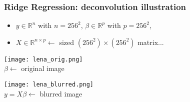 \documentclass[compress, smaller, serif, 9pt]{beamer}
\begin{document}
\begin{frame}
  \frametitle{Ridge Regression: deconvolution illustration}
  \begin{itemize}
   \item $y \in \mathbb{R}^{n}$ with $n=256^2$, \quad $\beta \in \mathbb{R}^{p}$ with $p=256^2$,
   \item $X \in \mathbb{R}^{n \times p} \leftarrow$ sized $(256^2) \times (256^2)$ matrix...
  \end{itemize}

  \begin{overprint}
  \begin{minipage}{.48\textwidth}
  \begin{center}
   \texttt{[image: lena\_orig.png]}\\
   $\beta \leftarrow$ original image
   \end{center}
  \end{minipage} \hfill
  \begin{minipage}{.48\textwidth}
  \begin{center}
   \texttt{[image: lena\_blurred.png]}\\
   $y=X\beta \leftarrow$ blurred image
   \end{center}
  \end{minipage}
  \medskip \\
  \end{overprint}  
\end{frame}
\end{document}
